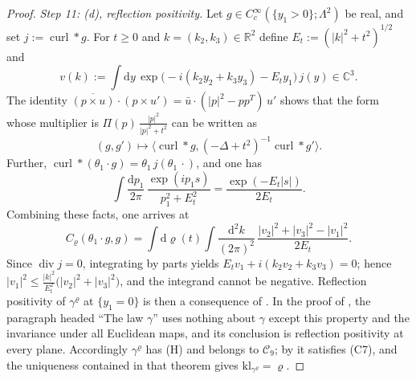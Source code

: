 \documentclass[11pt,letterpaper,reqno]{amsart}
\theoremstyle{definition}
\begin{document}
\begin{proof}
\emph{Step 11: (d), reflection positivity.}
Let $g\in C_c^\infty(\{y_1>0\};\Lambda^2)$ be real, and set $j:=\operatorname{curl}\ast g$.
For $t\ge0$ and $k=(k_2,k_3)\in\mathbb R^2$ define $E_t:=(|k|^2+t^2)^{1/2}$ and
\begin{equation*}
v(k):=\int\mathrm dy\,\exp\bigl(-i(k_2y_2+k_3y_3)-E_ty_1\bigr)\,j(y)\in\mathbb C^3.
\end{equation*}
The identity $\overline{(p\times u)}\cdot(p\times u')=\allowbreak \bar u\cdot(|p|^2-pp^T)\,\allowbreak u'$ shows that the form whose multiplier is $\Pi(p)\,\frac{|p|^2}{|p|^2+t^2}$ can be written as
\begin{equation*}
(g,g')\mapsto\bigl\langle\operatorname{curl}\ast g,(-\Delta+t^2)^{-1}\operatorname{curl}\ast g'\bigr\rangle.
\end{equation*}
Further, $\operatorname{curl}\ast(\theta_1\cdot g)=\allowbreak \theta_1\,\allowbreak j(\theta_1\,\allowbreak \cdot)$, and one has
\begin{equation*}
\int\frac{\mathrm dp_1}{2\pi}\,\frac{\exp(ip_1s)}{p_1^2+E_t^2}=\frac{\exp(-E_t|s|)}{2E_t}.
\end{equation*}
Combining these facts, one arrives at
\begin{equation*}
C_\varrho(\theta_1\cdot g,g)=\int\mathrm d\varrho(t)\int\frac{\mathrm d^2k}{(2\pi)^2}\,\frac{|v_2|^2+|v_3|^2-|v_1|^2}{2E_t}.
\end{equation*}
Since $\operatorname{div}j=0$, integrating by parts yields $E_tv_1+i(k_2v_2+k_3v_3)=0$; hence $|v_1|^2\le\frac{|k|^2}{E_t^2}\bigl(|v_2|^2+|v_3|^2\bigr)$, and the integrand cannot be negative.
Reflection positivity of $\gamma^\varrho$ at $\{y_1=0\}$ is then a consequence of \cite[Lemma~9.11\,(d)]{QEDI}.
In the proof of \cite[Lemma~12.29]{QEDII}, the paragraph headed ``The law $\gamma$'' uses nothing about $\gamma$ except this property and the invariance under all Euclidean maps, and its conclusion is reflection positivity at every plane.
Accordingly $\gamma^\varrho$ has (H) and belongs to $\mathcal C_9$; by \cite[Theorem~1.4, Part~I\,(d), (f)]{QEDII} it satisfies (C7), and the uniqueness contained in that theorem gives $\mathrm{kl}_{\gamma^\varrho}=\varrho$.


\end{proof}
\end{document}
